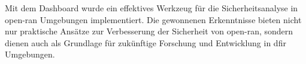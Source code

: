 Mit dem Dashboard wurde ein effektives Werkzeug für die Sicherheitsanalyse in \gls{open-ran} Umgebungen implementiert. Die gewonnenen Erkenntnisse bieten nicht nur praktische Ansätze zur Verbesserung der Sicherheit von \gls{open-ran}, sondern dienen auch als Grundlage für zukünftige Forschung und Entwicklung in \gls{dfir} Umgebungen.